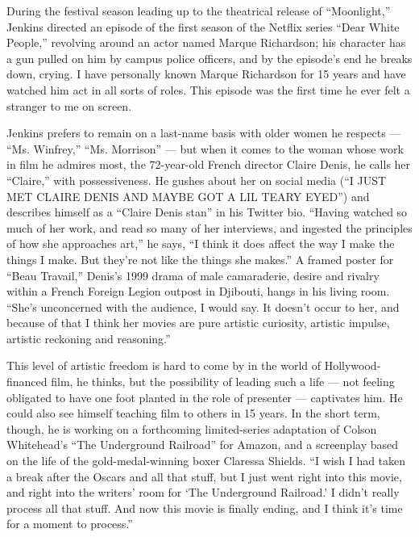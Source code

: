 During the festival season leading up to the theatrical release of
``Moonlight,'' Jenkins directed an episode of the first season of the
Netflix series ``Dear White People,'' revolving around an actor named
Marque Richardson; his character has a gun pulled on him by campus
police officers, and by the episode's end he breaks down, crying. I have
personally known Marque Richardson for 15 years and have watched him act
in all sorts of roles. This episode was the first time he ever felt a
stranger to me on screen.

Jenkins prefers to remain on a last-name basis with older women he
respects --- ``Ms. Winfrey,'' ``Ms. Morrison'' --- but when it comes to
the woman whose work in film he admires most, the 72-year-old French
director Claire Denis, he calls her ``Claire,'' with possessiveness. He
gushes about her on social media (``I JUST MET CLAIRE DENIS AND MAYBE
GOT A LIL TEARY EYED'') and describes himself as a ``Claire Denis stan''
in his Twitter bio. ``Having watched so much of her work, and read so
many of her interviews, and ingested the principles of how she
approaches art,'' he says, ``I think it does affect the way I make the
things I make. But they're not like the things she makes.'' A framed
poster for ``Beau Travail,'' Denis's 1999 drama of male camaraderie,
desire and rivalry within a French Foreign Legion outpost in Djibouti,
hangs in his living room. ``She's unconcerned with the audience, I would
say. It doesn't occur to her, and because of that I think her movies are
pure artistic curiosity, artistic impulse, artistic reckoning and
reasoning.''

This level of artistic freedom is hard to come by in the world of
Hollywood-financed film, he thinks, but the possibility of leading such
a life --- not feeling obligated to have one foot planted in the role of
presenter --- captivates him. He could also see himself teaching film to
others in 15 years. In the short term, though, he is working on a
forthcoming limited-series adaptation of Colson Whitehead's ``The
Underground Railroad'' for Amazon, and a screenplay based on the life of
the gold-medal-winning boxer Claressa Shields. ``I wish I had taken a
break after the Oscars and all that stuff, but I just went right into
this movie, and right into the writers' room for `The Underground
Railroad.' I didn't really process all that stuff. And now this movie is
finally ending, and I think it's time for a moment to process.''

